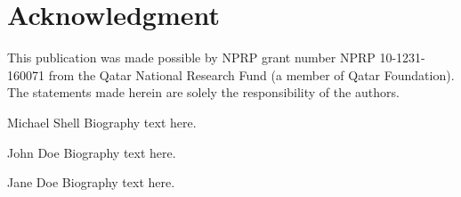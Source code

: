 \documentclass[journal,comsoc]{IEEEtran}
\renewcommand{\^}{\hat}  %
\begin{document}
\section*{Acknowledgment}
%
This publication was made possible by NPRP grant number NPRP 10-1231-160071 from the Qatar National Research Fund (a member of Qatar Foundation). The statements made herein are solely the responsibility of the authors.
%
%
\ifCLASSOPTIONcaptionsoff
\newpage
\fi

% 

%
%
\begin{IEEEbiography}{Michael Shell}
  Biography text here.
\end{IEEEbiography}
%
\begin{IEEEbiographynophoto}{John Doe}
  Biography text here.
\end{IEEEbiographynophoto}
%
%
\begin{IEEEbiographynophoto}{Jane Doe}
  Biography text here.
\end{IEEEbiographynophoto}
%





\end{document}
